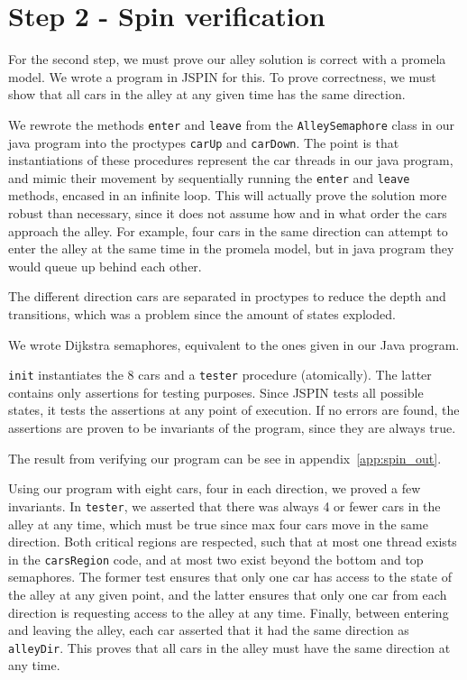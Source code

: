 \section{Step 2 - Spin verification}
For the second step, we must prove our alley solution is correct with a promela model. We wrote a program in JSPIN for this. To prove correctness, we must show that all cars in the alley at any given time has the same direction.

We rewrote the methods \texttt{enter} and \texttt{leave} from the \texttt{AlleySemaphore} class in our java program into the proctypes \texttt{carUp} and \texttt{carDown}. The point is that instantiations of these procedures represent the car threads in our java program, and mimic their movement by sequentially running the \texttt{enter} and \texttt{leave} methods, encased in an infinite loop. This will actually prove the solution more robust than necessary, since it does not assume how and in what order the cars approach the alley. For example, four cars in the same direction can attempt to enter the alley at the same time in the promela model, but in java program they would queue up behind each other.

The different direction cars are separated in proctypes to reduce the depth and transitions, which was a problem since the amount of states exploded.

We wrote Dijkstra semaphores, equivalent to the ones given in our Java program.

\texttt{init} instantiates the 8 cars and a \texttt{tester} procedure (atomically). The latter contains only assertions for testing purposes. Since JSPIN tests all possible states, it tests the assertions at any point of execution. If no errors are found, the assertions are proven to be invariants of the program, since they are always true.

The result from verifying our program can be see in appendix~\ref{app:spin_out}.

Using our program with eight cars, four in each direction, we proved a few invariants. In \texttt{tester}, we asserted that there was always 4 or fewer cars in the alley at any time, which must be true since max four cars move in the same direction. Both critical regions are respected, such that at most one thread exists in the \texttt{carsRegion} code, and at most two exist beyond the bottom and top semaphores. The former test ensures that only one car has access to the state of the alley at any given point, and the latter ensures that only one car from each direction is requesting access to the alley at any time. Finally, between entering and leaving the alley, each car asserted that it had the same direction as \texttt{alleyDir}. This proves that all cars in the alley must have the same direction at any time.

